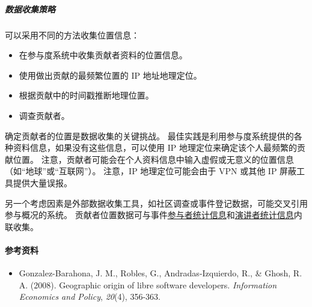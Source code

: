 \hypertarget{ux6570ux636eux6536ux96c6ux7b56ux7565}{%
\subparagraph{数据收集策略}\label{ux6570ux636eux6536ux96c6ux7b56ux7565}}

可以采用不同的方法收集位置信息：

\begin{itemize}
\tightlist
\item
  在参与度系统中收集贡献者资料的位置信息。
\item
  使用做出贡献的最频繁位置的 IP 地址地理定位。
\item
  根据贡献中的时间戳推断地理位置。
\item
  调查贡献者。
\end{itemize}

确定贡献者的位置是数据收集的关键挑战。
最佳实践是利用参与度系统提供的各种资料信息，如果没有这些信息，可以使用
IP 地理定位来确定该个人最频繁的贡献位置。
注意，贡献者可能会在个人资料信息中输入虚假或无意义的位置信息（如``地球''或``互联网''）。
注意，IP 地理定位可能会由于 VPN 或其他 IP 屏蔽工具提供大量误报。

另一个考虑因素是外部数据收集工具，如社区调查或事件登记数据，可能交叉引用参与概况的系统。
贡献者位置数据可与事件\href{https://chaoss.community/metric-attendee-demographics/}{参与者统计信息}和\href{https://chaoss.community/metric-speaker-demographics/}{演讲者统计信息}内联收集。

\hypertarget{ux53c2ux8003ux8d44ux6599}{%
\paragraph{参考资料}\label{ux53c2ux8003ux8d44ux6599}}

\begin{itemize}
\tightlist
\item
  Gonzalez-Barahona, J. M., Robles, G., Andradas-Izquierdo, R., \&
  Ghosh, R. A. (2008). Geographic origin of libre software developers.
  \emph{Information Economics and Policy}, \emph{20}(4), 356-363.
\end{itemize}
